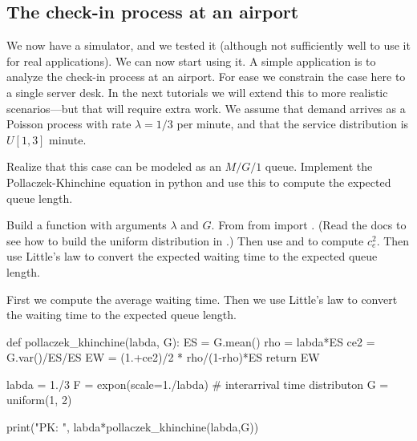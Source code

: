 \subsection{The check-in process at an airport}
\label{sec:check-in-process-at}

We now have a simulator, and we tested it (although not sufficiently well to use it for real applications).
We can now start using it.
A simple application is to analyze the check-in process at an airport.
For ease we constrain the case here to a single server desk.
In the next tutorials we will extend this to more realistic scenarios---but that will require extra work.
We assume that demand arrives as a Poisson process with rate $\lambda=1/3$ per minute, and that the service distribution is $U[1,3]$ minute.


\begin{exercise}\label{ex:5}
  Realize that this case can be modeled as an $M/G/1$ queue.
  Implement the Pollaczek-Khinchine equation in python and use this to compute the expected queue length.

  
  \begin{hint}
Build a function with arguments $\lambda$ and $G$. From from  import . (Read the docs to see how to build the uniform distribution in .) Then use  and  to compute $c_e^2$.  Then use Little's law to convert the expected waiting time to the expected queue length. 
  \end{hint}
  \begin{solution}

First we compute the average waiting time.  Then we use Little's law to convert the waiting time to the expected queue length.

    \begin{pyblock}

def pollaczek_khinchine(labda, G):
    ES = G.mean()
    rho = labda*ES
    ce2 = G.var()/ES/ES
    EW = (1.+ce2)/2 * rho/(1-rho)*ES
    return EW

    
labda = 1./3
F = expon(scale=1./labda)  # interarrival time distributon
G = uniform(1, 2)

print("PK: ", labda*pollaczek_khinchine(labda,G))
      
    \end{pyblock}

  \end{solution}

\end{exercise}

